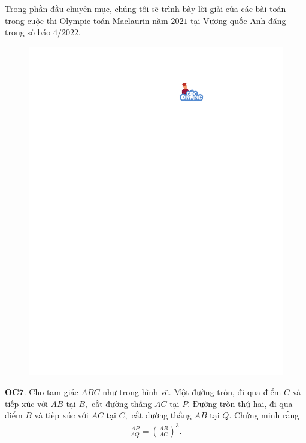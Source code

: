 \begin{multicols}{2}
	\setlength{\abovedisplayskip}{4pt}
	\setlength{\belowdisplayskip}{4pt}
	Trong phần đầu chuyên mục, chúng tôi sẽ trình bày lời giải của các bài toán trong cuộc thi Olympic toán Maclaurin năm $2021$ tại Vương quốc Anh đăng trong số báo $4/2022$. 
	\begin{figure}[H]
		\vspace*{-5pt}
		\centering
		\captionsetup{labelformat= empty, justification=centering}
		\includegraphics[width= 0.85\linewidth]{gocolympic}
		\vspace*{-5pt}
	\end{figure}
	{\bf\color{cackithi} OC$\pmb{7.}$} Cho tam giác $ABC$ như trong hình vẽ. Một đường tròn, đi qua điểm $C$ và tiếp xúc với $AB$ tại $B,$ cắt đường thẳng $AC$ tại $P$. Đường tròn thứ hai, đi qua điểm $B$ và tiếp xúc với $AC$ tại $C,$ cắt đường thẳng $AB$ tại $Q.$  Chứng minh rằng 
	\begin{align*}
		\frac{AP}{AQ}= \left(\frac{AB}{AC} \right)^3.
	\end{align*}
	\begin{figure}[H]
		\vspace*{-5pt}
		\centering

\end{figure}
\end{multicols}
